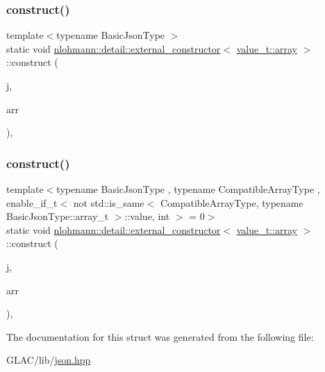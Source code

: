 \subsubsection{\texorpdfstring{construct()}{construct()}\hspace{0.1cm}{\footnotesize\ttfamily [1/2]}}
{\footnotesize\ttfamily template$<$typename Basic\+Json\+Type $>$ \\
static void \mbox{\hyperlink{structnlohmann_1_1detail_1_1external__constructor}{nlohmann\+::detail\+::external\+\_\+constructor}}$<$ \mbox{\hyperlink{namespacenlohmann_1_1detail_a90aa5ef615aa8305e9ea20d8a947980faf1f713c9e000f5d3f280adbd124df4f5}{value\+\_\+t\+::array}} $>$\+::construct (\begin{DoxyParamCaption}\item[{Basic\+Json\+Type \&}]{j,  }\item[{const typename Basic\+Json\+Type\+::array\+\_\+t \&}]{arr }\end{DoxyParamCaption})\hspace{0.3cm}{\ttfamily [inline]}, {\ttfamily [static]}}

\mbox{\label{structnlohmann_1_1detail_1_1external__constructor_3_01value__t_1_1array_01_4_a110f50fd5378da876d9a6d6a8d945e37}} 
\subsubsection{\texorpdfstring{construct()}{construct()}\hspace{0.1cm}{\footnotesize\ttfamily [2/2]}}
{\footnotesize\ttfamily template$<$typename Basic\+Json\+Type , typename Compatible\+Array\+Type , enable\+\_\+if\+\_\+t$<$ not std\+::is\+\_\+same$<$ Compatible\+Array\+Type, typename Basic\+Json\+Type\+::array\+\_\+t $>$\+::value, int $>$  = 0$>$ \\
static void \mbox{\hyperlink{structnlohmann_1_1detail_1_1external__constructor}{nlohmann\+::detail\+::external\+\_\+constructor}}$<$ \mbox{\hyperlink{namespacenlohmann_1_1detail_a90aa5ef615aa8305e9ea20d8a947980faf1f713c9e000f5d3f280adbd124df4f5}{value\+\_\+t\+::array}} $>$\+::construct (\begin{DoxyParamCaption}\item[{Basic\+Json\+Type \&}]{j,  }\item[{const Compatible\+Array\+Type \&}]{arr }\end{DoxyParamCaption})\hspace{0.3cm}{\ttfamily [inline]}, {\ttfamily [static]}}



The documentation for this struct was generated from the following file\+:\begin{DoxyCompactItemize}
\item 
G\+L\+A\+C/lib/\mbox{\hyperlink{json_8hpp}{json.\+hpp}}\end{DoxyCompactItemize}
